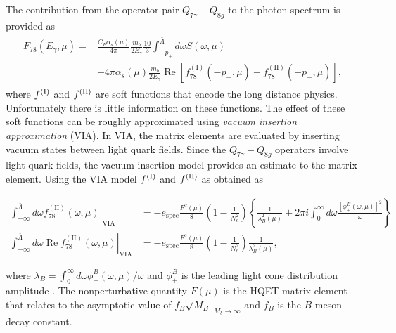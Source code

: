 The contribution from the operator pair $Q_{7\gamma}-Q_{8g}$ to the photon spectrum is provided as \cite{Benzke:2010js}
\begin{eqnarray}
\begin{aligned}
F_{78}\left(E_{\gamma}, \mu\right)=& \frac{C_{F} \alpha_{s}(\mu)}{4 \pi} \frac{m_{b}}{2 E_{\gamma}} \frac{10}{3} \int_{-p_{+}}^{\bar{\Lambda}} d \omega S(\omega, \mu) \\
&+4 \pi \alpha_{s}(\mu) \frac{m_{b}}{2 E_{\gamma}} \operatorname{Re}\left[f_{78}^{(\mathrm{I})}\left(-p_{+}, \mu\right)+f_{78}^{(\mathrm{II})}\left(-p_{+}, \mu\right)\right],
\end{aligned}
\end{eqnarray}
where $f^{(\rm{I})}$ and $f^{(\rm{II})}$ are soft functions that encode the long distance physics. Unfortunately there is little information on these functions. The effect of these soft functions can be roughly approximated using \textit{vacuum insertion approximation} (VIA). In VIA, the matrix elements are evaluated by inserting vacuum states between light quark fields. Since the $Q_{7\gamma}-Q_{8g}$ operators involve light quark fields, the vacuum insertion model provides an estimate to the matrix element. Using the VIA model $f^{(\rm{I})}$ and $f^{(\rm{II})}$ as obtained as \cite{Benzke:2010js}

\begin{align}
\left.\int_{-\infty}^{\bar{\Lambda}} d \omega f_{78}^{(\mathrm{II})}(\omega, \mu)\right|_{\mathrm{VIA}} &=-e_{\mathrm{spec}} \frac{F^{2}(\mu)}{8}\left(1-\frac{1}{N_{c}^{2}}\right)\left\{\frac{1}{\lambda_{B}^{2}(\mu)}+2 \pi i \int_{0}^{\infty} d \omega \frac{\left[\phi_{+}^{B}(\omega, \mu)\right]^{2}}{\omega}\right\}\nonumber \\
\left.\int_{-\infty}^{\bar{\Lambda}} d \omega \operatorname{Re} f_{78}^{(\mathrm{II})}(\omega, \mu)\right|_{\mathrm{VIA}} &=-e_{\mathrm{spec}} \frac{F^{2}(\mu)}{8}\left(1-\frac{1}{N_{c}^{2}}\right) \frac{1}{\lambda_{B}^{2}(\mu)}, 
\end{align}

where $\lambda_{B}=\int_{0}^{\infty} d \omega \phi_{+}^{B}(\omega, \mu) / \omega$ and $\phi_{+}^{B}$ is the leading light cone distribution amplitude \cite{Grozin:1996pq}. The nonperturbative quantity $F(\mu)$ is the HQET matrix element that relates to the asymptotic value of $f_{B} \sqrt{M_{B}}|_{M_b\rightarrow \infty}$ and $f_B$ is the $B$ meson decay constant.
\vspace{-0.3cm}
